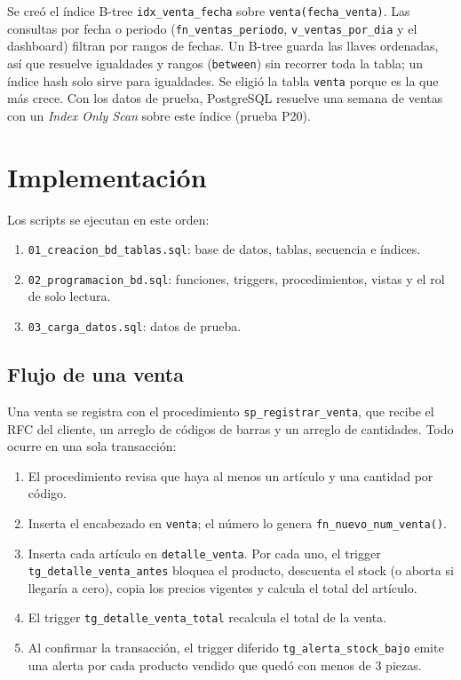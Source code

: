 \documentclass[12pt,a4paper]{article}
\newcommand{\cod}[1]{{\ttfamily\nolinkurl{#1}}}
\begin{document}
Se creó el índice B-tree \cod{idx_venta_fecha} sobre \cod{venta(fecha_venta)}. Las
consultas por fecha o periodo (\cod{fn_ventas_periodo}, \cod{v_ventas_por_dia} y el
dashboard) filtran por rangos de fechas. Un B-tree guarda las llaves ordenadas, así
que resuelve igualdades y rangos (\cod{between}) sin recorrer toda la tabla; un
índice hash solo sirve para igualdades. Se eligió la tabla \cod{venta} porque es la
que más crece. Con los datos de prueba, PostgreSQL resuelve una semana de ventas con
un \textit{Index Only Scan} sobre este índice (prueba P20).

\section{Implementación}

Los scripts se ejecutan en este orden:

\begin{enumerate}[leftmargin=1.2cm, itemsep=0.2em]
\item \cod{01_creacion_bd_tablas.sql}: base de datos, tablas, secuencia e índices.
\item \cod{02_programacion_bd.sql}: funciones, triggers, procedimientos, vistas y
el rol de solo lectura.
\item \cod{03_carga_datos.sql}: datos de prueba.
\end{enumerate}

\subsection{Flujo de una venta}

Una venta se registra con el procedimiento \cod{sp_registrar_venta}, que recibe el
RFC del cliente, un arreglo de códigos de barras y un arreglo de cantidades. Todo
ocurre en una sola transacción:

\begin{enumerate}[leftmargin=1.2cm, itemsep=0.2em]
\item El procedimiento revisa que haya al menos un artículo y una cantidad por código.
\item Inserta el encabezado en \cod{venta}; el número lo genera
\cod{fn_nuevo_num_venta()}.
\item Inserta cada artículo en \cod{detalle_venta}. Por cada uno, el trigger
\cod{tg_detalle_venta_antes} bloquea el producto, descuenta el stock (o aborta si
llegaría a cero), copia los precios vigentes y calcula el total del artículo.
\item El trigger \cod{tg_detalle_venta_total} recalcula el total de la venta.
\item Al confirmar la transacción, el trigger diferido \cod{tg_alerta_stock_bajo}
emite una alerta por cada producto vendido que quedó con menos de 3 piezas.
\end{enumerate}
\end{document}
